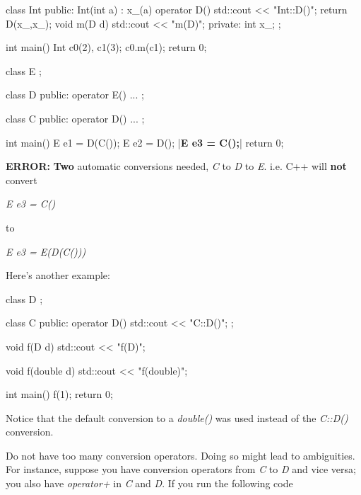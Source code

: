 \begin{consolethree}[escapeinside=||]
class Int
{
public:
    Int(int a)
        : x_(a)
    {}
    operator D()
    {
        std::cout << "Int::D()\n";
        return D(x_,x_);
    }
    void m(D d)
    {
        std::cout << "m(D)\n";
    }
private:
    int x_;
};
\end{consolethree}

\begin{consolethree}[escapeinside=||]
int main()
{
    Int c0(2), c1(3);
    c0.m(c1);
    return 0;
}
\end{consolethree}

\begin{consolethree}[escapeinside=||]
class E {};

class D
{
public:
    operator E()
    {
        ...
    }
};

class C
{
public:
    operator D()
    {
        ...
    }
};

int main()
{
    E e1 = D(C());
    E e2 = D();
    |{\bf E e3 = C();}|
    return 0;
}
\end{consolethree}

\textbf{ERROR:} \textbf{Two} automatic conversions needed, \textit{C} to
\textit{D} to \textit{E}. i.e. C++ will \textbf{not} convert

\textit{E e3 = C()}

to

\textit{E e3 = E(D(C()))}

Here's another example:

\begin{consolethree}[escapeinside=||]
class D {};

class C
{
public:
    operator D() { std::cout << "C::D()\n"; }
};

void f(D d) { std::cout << "f(D)\n"; }

void f(double d) { std::cout << "f(double)\n"; }

int main()
{
    f(1);
    return 0;
}
\end{consolethree}

Notice that the default conversion to a \textit{double()} was used instead
of the \textit{C::D()} conversion.


\newpage{}

Do not have too many conversion operators. Doing so might lead to
ambiguities. For instance, suppose you have conversion operators from
\textit{C} to \textit{D} and vice versa; you also have \textit{operator+} in
\textit{C} and \textit{D}. If you run the following code

